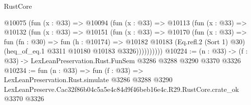 \begin{lexlean}{RustCore}
\begin{coremodule}
        @10075
          (fun (x : @33) =>
          @10094
            (fun (x : @33) =>
            @10113
              (fun (x : @33) =>
              @10132
                (fun (x : @33) =>
                @10151
                  (fun (x : @33) =>
                  @10170
                    (fun (x : @33) =>
                    fun (fn : @30) =>
                    fun (h : @10174) =>
                    @10182
                      @10183
                      (Eq.refl.{2} (Sort 1) @30)
                      (heq_of_eq.{1} @3311 @10180 @10183 @3326))))))))))
@10224 := (n : @33) -> (f : @33) -> LexLeanPreservation.Rust.FunSem @3286 @3288 @3290 @3370 @3326
@10234 := fun (n : @33) =>
  fun (f : @33) =>
  LexLeanPreservation.Rust.simulate
    @3286
    @3288
    @3290
    LexLeanPreserve.Cac32f86b04c5a5e4c84d9f46beb16e4c.R29.RustCore.crate_ok
    @3370
    @3326
\end{coremodule}
\end{lexlean}
